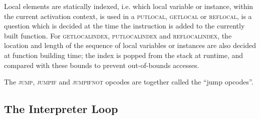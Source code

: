 Local elements are statically indexed, i.e. which local variable or
instance, within the current activation context, is used in a
\textsc{putlocal}, \textsc{getlocal} or \textsc{reflocal}, is a question
which is decided at the time the instruction is added to the currently
built function. For \textsc{getlocalindex}, \textsc{putlocalindex} and
\textsc{reflocalindex}, the location and length of the sequence of local
variables or instances are also decided at function building time; the
index is popped from the stack at runtime, and compared with these
bounds to prevent out-of-bounds accesses.

The \textsc{jump}, \textsc{jumpif} and \textsc{jumpifnot} opcodes are
together called the ``jump opcodes''.

\subsection{The Interpreter Loop}\label{syntax:loop}

